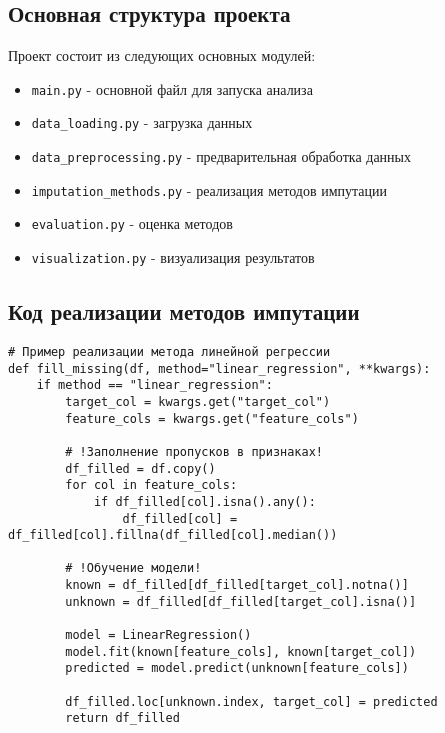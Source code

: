 \documentclass[12pt,a4paper]{article}
\begin{document}
\subsection{Основная структура проекта}
Проект состоит из следующих основных модулей:
\begin{itemize}
    \item \texttt{main.py} - основной файл для запуска анализа
    \item \texttt{data\_loading.py} - загрузка данных
    \item \texttt{data\_preprocessing.py} - предварительная обработка данных
    \item \texttt{imputation\_methods.py} - реализация методов импутации
    \item \texttt{evaluation.py} - оценка методов
    \item \texttt{visualization.py} - визуализация результатов
\end{itemize}

\subsection{Код реализации методов импутации}
\begin{lstlisting}[escapechar=!]
# Пример реализации метода линейной регрессии
def fill_missing(df, method="linear_regression", **kwargs):
    if method == "linear_regression":
        target_col = kwargs.get("target_col")
        feature_cols = kwargs.get("feature_cols")
        
        # !Заполнение пропусков в признаках!
        df_filled = df.copy()
        for col in feature_cols:
            if df_filled[col].isna().any():
                df_filled[col] = df_filled[col].fillna(df_filled[col].median())
        
        # !Обучение модели!
        known = df_filled[df_filled[target_col].notna()]
        unknown = df_filled[df_filled[target_col].isna()]
        
        model = LinearRegression()
        model.fit(known[feature_cols], known[target_col])
        predicted = model.predict(unknown[feature_cols])
        
        df_filled.loc[unknown.index, target_col] = predicted
        return df_filled
\end{lstlisting}
\end{document}
